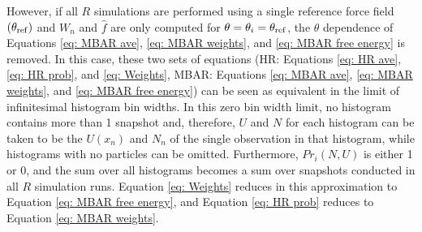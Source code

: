 \documentclass[journal=jced,manuscript=article]{achemso}
\begin{document}
However, if all $R$ simulations are performed using a single reference force field $(\theta_{\rm ref})$ and $W_{n}$ and $\hat f$ are only computed for $\theta = \theta_i = \theta_{\rm ref}$, the $\theta$ dependence of Equations \ref{eq: MBAR ave}, \ref{eq: MBAR weights}, and \ref{eq: MBAR free energy} is removed. In this case, these two sets of equations (HR: Equations \ref{eq: HR ave}, \ref{eq: HR prob}, and \ref{eq: Weights}, MBAR: Equations \ref{eq: MBAR ave}, \ref{eq: MBAR weights}, and \ref{eq: MBAR free energy}) can be seen as equivalent in the limit of infinitesimal histogram bin widths. In this zero bin width limit, no histogram contains more than 1 snapshot and, therefore, $U$ and $N$ for each histogram can be taken to be the $U(x_n)$ and $N_n$ of the single observation in that histogram, while histograms with no particles can be omitted. Furthermore, $Pr_i(N,U)$ is either 1 or 0, and the sum over all histograms becomes a sum over snapshots conducted in all $R$ simulation runs. Equation \ref{eq: Weights} reduces in this approximation to Equation \ref{eq: MBAR free energy}, and Equation \ref{eq: HR prob} reduces to Equation \ref{eq: MBAR weights}.

\end{document}
